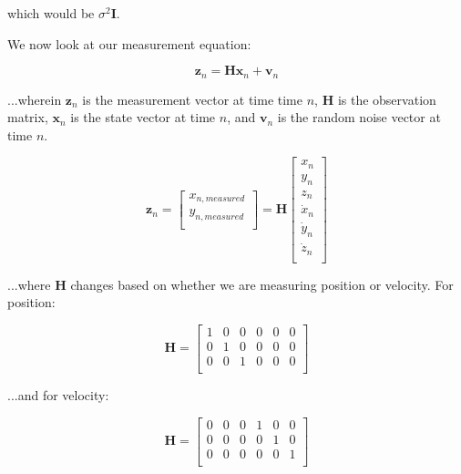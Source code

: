 \documentclass{article}
\begin{document}
which would be $\sigma^2 \textbf{I}$.

We now look at our measurement equation:

\begin{equation}
    \textbf{z}_n = \textbf{H} \textbf{x}_n + \textbf{v}_n
\end{equation}

...wherein $\textbf{z}_n$ is the measurement vector at time time $n$, $\textbf{H}$ is the observation matrix, $\textbf{x}_n$ is the state vector at time $n$, and $\textbf{v}_n$ is the random noise vector at time $n$.

\begin{equation}
    \textbf{z}_n = \begin{bmatrix}
        x_{n,measured} \\
        y_{n,measured} \\
    \end{bmatrix} = \textbf{H} \begin{bmatrix}
        x_n       \\
        y_n       \\
        z_n       \\
        \dot{x}_n \\
        \dot{y}_n \\
        \dot{z}_n \\
    \end{bmatrix}
\end{equation}

...where \textbf{H} changes based on whether we are measuring position or velocity. For position:

\begin{equation}
    \textbf{H} = \begin{bmatrix}
        1 & 0 & 0 & 0 & 0 & 0 \\
        0 & 1 & 0 & 0 & 0 & 0 \\
        0 & 0 & 1 & 0 & 0 & 0 \\
    \end{bmatrix}
\end{equation}

...and for velocity:

\begin{equation}
    \textbf{H} = \begin{bmatrix}
        0 & 0 & 0 & 1 & 0 & 0 \\
        0 & 0 & 0 & 0 & 1 & 0 \\
        0 & 0 & 0 & 0 & 0 & 1 \\
    \end{bmatrix}
\end{equation}
\end{document}
